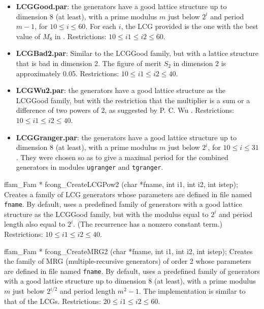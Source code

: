 \begin{itemize}
\item  {\bf LCGGood.par}: the generators have a good lattice structure up to 
     dimension 8 (at least), with a prime modulus $m$ just below $2^i$ and
     period $m-1$, for $10 \le i \le 60$. For each $i$, the LCG provided
     is the one with the best value of $M_8$ in \cite{rLEC99c}.
     Restrictions: $10 \le i1 \le i2 \le 60$.

 
\item  {\bf LCGBad2.par}: Similar to the LCGGood family, but with a lattice 
     structure that is bad in dimension 2. The figure of merit
     $S_2$ in dimension 2 is approximately 0.05.
     Restrictions: $10 \le i1 \le i2 \le 40$.

\item {\bf  LCGWu2.par}: the generators have a good lattice structure as the
     LCGGood family, but with the restriction that the multiplier is a sum
     or a difference of two powers of 2, as suggested by P. C. Wu 
     \cite{rWU97a}. Restrictions: $ 10 \le i1 \le i2 \le 40$.

\item  {\bf LCGGranger.par}: the generators have a good lattice structure up
     to dimension 8 (at least), with a prime modulus $m$ just below $2^i$,
     for $10 \le i \le 31$. They were chosen so as to give a
     maximal period for the combined generators in modules {\tt ugranger}
     and {\tt tgranger}.
\end{itemize}
\endtab
\code


ffam_Fam * fcong_CreateLCGPow2 (char *fname, int i1, int i2, int istep);
\endcode
\tab
 Creates a family of LCG generators whose parameters are defined in file
 named {\tt fname}. By default, uses a predefined family of generators
 with a good lattice structure as the  LCGGood family, but with the modulus
 equal to $2^i$ and period
 length also equal to $2^i$. (The recurrence has a nonzero constant term.)
 Restrictions: $10 \le i1 \le i2 \le 40$.
\endtab
\code


ffam_Fam * fcong_CreateMRG2 (char *fname, int i1, int i2, int istep);
\endcode
\tab
 Creates the family of MRG (multiple-recursive generators) of order 2 whose
 parameters are defined in  file named {\tt fname}. By default, uses
 a predefined family of generators with
 a good lattice structure up to dimension 8 (at least), with a prime
 modulus $m$ just below $2^{i/2}$ and period length $m^2-1$.
 The implementation is similar to that of the LCGs.
 Restrictions: $ 20 \le i1 \le i2 \le 60$.
\endtab
\code



